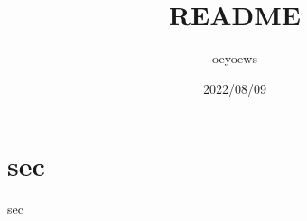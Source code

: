 \documentclass{article}
\title{README}
\author{oeyoews}
\date{2022/08/09}
\begin{document}
\maketitle

\section{sec}%

sec
\end{document}

